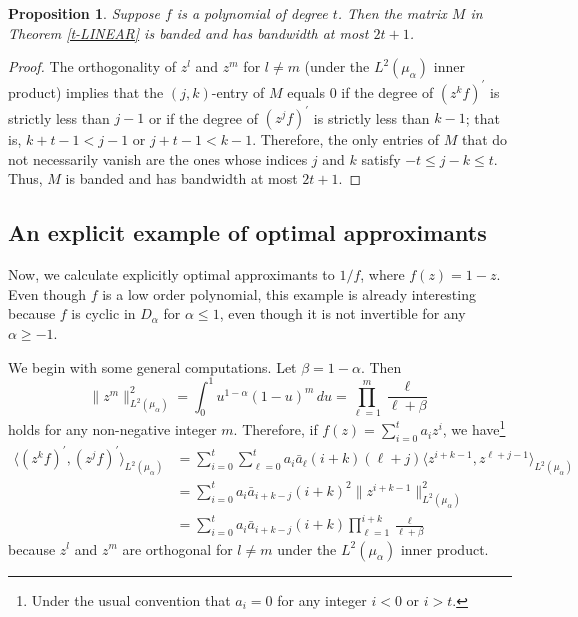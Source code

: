\documentclass[11 pt,reqno]{amsart}
\newtheorem{prop}[thm]{Proposition}
\theoremstyle{definition}
\theoremstyle{remark}
\numberwithin{equation}{section} \numberwithin{figure}{section}
\begin{document}
\begin{prop}\label{t-2tdiagonal}
Suppose $f$ is a polynomial of degree $t$.  Then the matrix $M$ in Theorem \ref{t-LINEAR}
is banded and has bandwidth at most $2t+1$.
\end{prop}
\begin{proof}
The orthogonality of $z^l$ and $z^m$ for $l \neq m$ (under the $L^{2}(\mu_{\alpha})$
inner product) implies that the $(j,k)$-entry of $M$ equals $0$ if the degree of
$(z^{k}f)^{\prime}$ is strictly less than $j-1$ or if the degree of $(z^{j} f)^{\prime}$
is strictly less than $k-1$; that is, $k+t-1<j-1$ or $j+t-1<k-1$.  Therefore, the only
entries of $M$ that do not necessarily vanish are the ones whose indices $j$ and $k$
satisfy $-t\leq j-k\leq t$.  Thus, $M$ is banded and has bandwidth at most $2t+1$.
\end{proof}

\subsection{An explicit example of optimal approximants}\label{optimalPnEx} Now, we calculate explicitly optimal approximants to $1/f$,
where $f(z)=1-z$.  Even though $f$ is a low order polynomial, this
example is already interesting because $f$ is cyclic in $D_\alpha$
for $\alpha \le 1$, even though it is not invertible for any
$\alpha\ge -1$.

We begin with some general computations.  Let $\beta=1-\alpha$.
Then
\begin{equation}
      \|z^{m}\|_{L^{2}(\mu_{\alpha})}^{2}=\int_{0}^{1}u^{1-\alpha}(1-u)^{m}\,du\nonumber =\prod_{\ell=1}^m \frac{\ell}{\ell+\beta}\label{zmL2Norm}
\end{equation}
holds for any non-negative integer $m$.  Therefore, if
$f(z) =\sum_{i=0}^{t}a_{i}z^{i}$, we have\footnote{Under the usual
convention that $a_{i}=0$ for any integer $i<0$ or $i>t$.}
\begin{align}
      \langle (z^{k} f)^{\prime},(z^{j}f)^{\prime}\rangle_{L^{2}(\mu_{\alpha})}
      &=\sum_{i=0}^{t}\sum_{\ell=0}^{t}a_{i}\bar{a}_{\ell}(i+k)(\ell+j)
      \langle z^{i+k-1},z^{\ell+j-1}\rangle_{L^{2}(\mu_{\alpha})}\nonumber\\
      &=\sum_{i=0}^{t}a_{i}\bar{a}_{i+k-j}(i+k)^{2}\|z^{i+k-1}\|_{L^{2}(\mu_{\alpha})}^2\nonumber\\
      &=\sum_{i=0}^{t}a_{i}\bar{a}_{i+k-j}
      (i+k)\prod_{\ell=1}^{i+k} \frac{\ell}{\ell+\beta}\label{L2InnerProducts}
\end{align}
because $z^l$ and $z^m$ are orthogonal for $l \neq m$ under the
$L^{2}(\mu_{\alpha})$ inner product.
\end{document}
